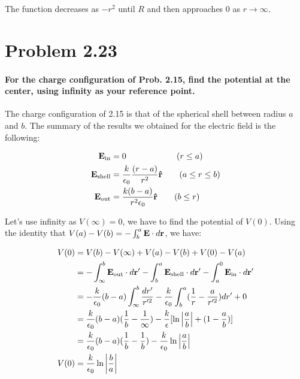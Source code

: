\documentclass{article}
\numberwithin{equation}{section}
\numberwithin{figure}{section}
\newcommand{\vbh}[1]{\vb{\hat{#1}}}
\begin{document}
The function decreases as $-r^2$ until $R$ and then approaches $0$ as $r \to \infty$.


\section{Problem 2.23}

\paragraph{For the charge configuration of Prob. 2.15, find the potential at the center, using infinity as your reference point. \\}

The charge configuration of 2.15 is that of the spherical shell between radius $a$ and $b$. The summary of the results we obtained for the electric field is the following:

\begin{equation}
\begin{split}
        \vb E_{\text{in}} &= 0 \quad \quad \quad \quad \quad \quad ( r \leq a) \\
        \vb E_{\text{shell}} &= \frac{k}{\epsilon_0} \frac{(r-a)}{r^2} \vbh r  \quad \quad (a \leq r \leq b) \\
        \vb E_{\text{out}} &= \frac{k(b-a)}{r^2 \epsilon_0} \vbh r  \quad \quad (b \leq r)
\end{split}
\end{equation}

Let's use infinity as $V(\infty) = 0$, we have to find the potential of $V(0)$. Using the identity that $V(a)-V(b) = - \int^a_b \vb E \cdot d \vb r$, we have:

\begin{equation}
    \begin{split}
        V(0) &= V(b) - V(\infty) + V(a) - V(b) + V(0) - V(a) \\
        &= - \int^b_\infty \vb E_{\text{out}} \cdot d \vb r' - \int^a_b \vb E_{\text{shell}} \cdot d \vb r' - \int^0_a \vb E_{\text{in}} \cdot d \vb r' \\
        &= -\frac{k}{\epsilon_0} (b-a) \int^b_\infty \frac{dr'}{r'^2} - \frac{k}{\epsilon_0} \int^a_b (\frac{1}{r} - \frac{a}{r'^2}) dr' + 0 \\
        &= \frac{k}{\epsilon_0} (b-a) (\frac{1}{b} - \frac{1}{\infty}) - \frac{k}{\epsilon} \lbrack \ln \abs{\frac{a}{b}} + (1 - \frac{a}{b}) \rbrack \\
        &= \frac{k}{\epsilon_0} (b-a) (\frac{1}{b} - \frac{1}{b}) - \frac{k}{\epsilon_0} \ln \abs{\frac{a}{b}} \\
        V(0) &= \frac{k}{\epsilon_0} \ln \abs{\frac{b}{a}}
    \end{split}
\end{equation}
\end{document}

